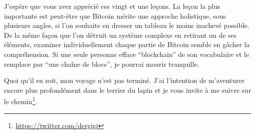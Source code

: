 J'espère que vous avez apprécié ces vingt et une leçons. La leçon la plus
importante est peut-être que Bitcoin mérite une approche holistique, sous
plusieurs angles, si l'on souhaite en dresser un tableau le moins inachevé
possible. De la même façon que l'on détruit un système complexe en retirant un
de ses éléments, examiner individuellement chaque partie de Bitcoin semble en
gâcher la compréhension. Si une seule personne efface \enquote{blockchain} de
son vocabulaire et le remplace par \enquote{une chaîne de blocs}, je pourrai
mourir tranquille.

Quoi qu'il en soit, mon voyage n'est pas terminé. J'ai l'intention de 
m'aventurer encore plus profondément dans le terrier du lapin et je vous invite
à me suivre sur le chemin\footnote{\url{https://twitter.com/dergigi}}.

%
